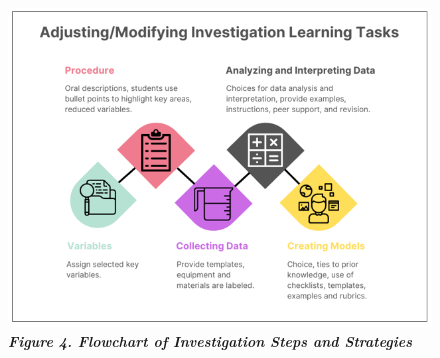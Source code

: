 \documentclass[11pt]{sig-alternate}
\begin{document}
\begin{large}
\begin{figure} [h]
    \centering
    \includegraphics[width=13cm]{figure4.PNG}
    \captionsetup{font=large}
    \caption*{\textit{\textbf{Figure 4. Flowchart of Investigation Steps and Strategies}}}
    \label{fig:fig4}
\end{figure}

\clearpage


\end{large}
\end{document}
